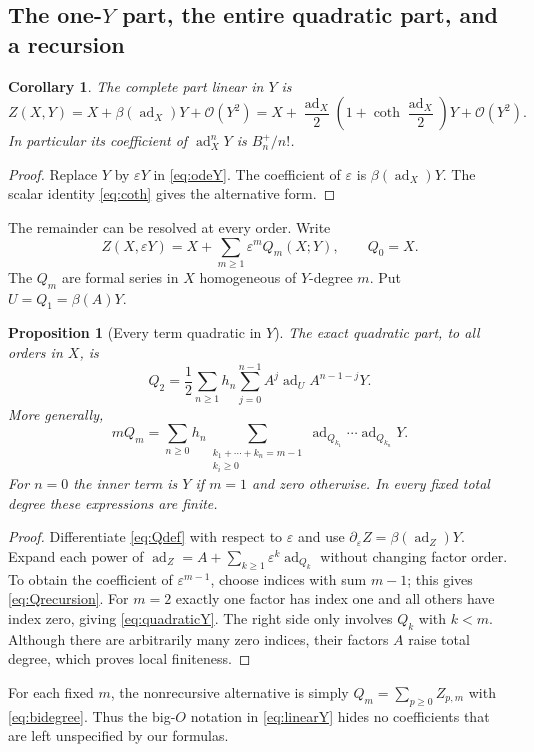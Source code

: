 \documentclass[11pt]{article}
\newtheorem{proposition}[theorem]{Proposition}
\newtheorem{corollary}[theorem]{Corollary}
\theoremstyle{definition}
\theoremstyle{remark}
\newcommand{\eps}{\varepsilon}
\newcommand{\ad}{\operatorname{ad}}
\newcommand{\smallO}{\mathcal O}
\numberwithin{equation}{section}
\begin{document}
\subsection{The one-\texorpdfstring{$Y$}{Y} part, the entire quadratic part, and a recursion}
\begin{corollary}\label{cor:singleY}
The complete part linear in $Y$ is
\begin{equation}\label{eq:linearY}
 Z(X,Y)=X+\beta(\ad_X)Y+\smallO(Y^2)
       =X+\frac{\ad_X}{2}\left(1+\coth\frac{\ad_X}{2}\right)Y
         +\smallO(Y^2).
\end{equation}
In particular its coefficient of $\ad_X^nY$ is $B_n^+/n!$.
\end{corollary}
\begin{proof}
Replace $Y$ by $\eps Y$ in \eqref{eq:odeY}. The coefficient of $\eps$ is $\beta(\ad_X)Y$. The scalar identity \eqref{eq:coth} gives the alternative form.
\end{proof}
The remainder can be resolved at every order. Write
\begin{equation}\label{eq:Qdef}
 Z(X,\eps Y)=X+\sum_{m\geq1}\eps^mQ_m(X;Y),\qquad Q_0=X.
\end{equation}
The $Q_m$ are formal series in $X$ homogeneous of $Y$-degree $m$. Put $U=Q_1=\beta(A)Y$.
\begin{proposition}[Every term quadratic in $Y$]\label{prop:quadratic}
The exact quadratic part, to all orders in $X$, is
\begin{equation}\label{eq:quadraticY}
 Q_2=\frac12\sum_{n\geq1}h_n\sum_{j=0}^{n-1}
        A^j\ad_U A^{n-1-j}Y.
\end{equation}
More generally,
\begin{equation}\label{eq:Qrecursion}
 mQ_m=\sum_{n\geq0}h_n
 \sum_{\substack{k_1+\cdots+k_n=m-1\\k_i\geq0}}
 \ad_{Q_{k_1}}\cdots\ad_{Q_{k_n}}Y.
\end{equation}
For $n=0$ the inner term is $Y$ if $m=1$ and zero otherwise. In every fixed total degree these expressions are finite.
\end{proposition}
\begin{proof}
Differentiate \eqref{eq:Qdef} with respect to $\eps$ and use
$\partial_\eps Z=\beta(\ad_Z)Y$. Expand each power of
$\ad_Z=A+\sum_{k\geq1}\eps^k\ad_{Q_k}$ without changing factor order. To obtain the coefficient of $\eps^{m-1}$, choose indices with sum $m-1$; this gives \eqref{eq:Qrecursion}. For $m=2$ exactly one factor has index one and all others have index zero, giving \eqref{eq:quadraticY}. The right side only involves $Q_k$ with $k<m$. Although there are arbitrarily many zero indices, their factors $A$ raise total degree, which proves local finiteness.
\end{proof}
For each fixed $m$, the nonrecursive alternative is simply $Q_m=\sum_{p\geq0}Z_{p,m}$ with \eqref{eq:bidegree}. Thus the big-$O$ notation in \eqref{eq:linearY} hides no coefficients that are left unspecified by our formulas.
\end{document}

